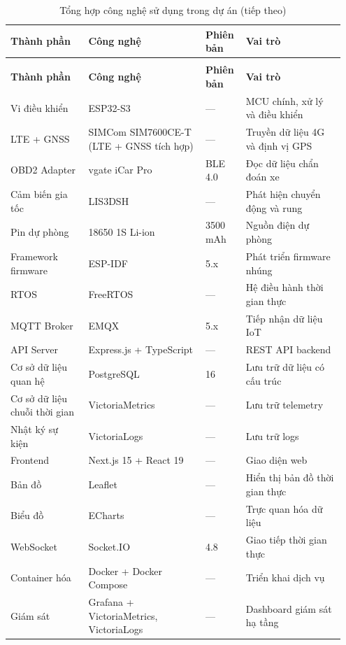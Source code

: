 \documentclass[a4paper]{extarticle}
\newcommand{\thesissettableid}[2]{%
  \renewcommand{\thetable}{#1}%
  \renewcommand{\theHtable}{#2}%
}
\begin{document}
{\thesissettableid{1.3}{tab-ch1-technology-stack-summary}
\def\LTcaptype{table}
\begin{longtable}{|L{0.223\linewidth}|L{0.334\linewidth}|L{0.115\linewidth}|L{0.282\linewidth}|}
\caption{Tổng hợp công nghệ sử dụng trong dự án}\label{tab:ch1-technology-stack-summary}\\
\hline \textbf{Thành phần} & \textbf{Công nghệ} & \textbf{Phiên bản} & \textbf{Vai trò} \\
\hline
\endfirsthead
\caption[]{Tổng hợp công nghệ sử dụng trong dự án (tiếp theo)}\\
\hline \textbf{Thành phần} & \textbf{Công nghệ} & \textbf{Phiên bản} & \textbf{Vai trò} \\
\hline
\endhead
\hline
\endfoot
\endlastfoot
Vi điều khiển & ESP32-S3 & --- & MCU chính, xử lý và điều khiển \\\hline
LTE + GNSS & SIMCom SIM7600CE-T (LTE + GNSS tích hợp) & --- & Truyền dữ
liệu 4G và định vị GPS \\\hline
OBD2 Adapter & vgate iCar Pro & BLE 4.0 & Đọc dữ liệu chẩn đoán xe \\\hline
Cảm biến gia tốc & LIS3DSH & --- & Phát hiện chuyển động và rung \\\hline
Pin dự phòng & 18650 1S Li-ion & 3500 mAh & Nguồn điện dự phòng \\\hline
Framework firmware & ESP-IDF & 5.x & Phát triển firmware nhúng \\\hline
RTOS & FreeRTOS & --- & Hệ điều hành thời gian thực \\\hline
MQTT Broker & EMQX & 5.x & Tiếp nhận dữ liệu IoT \\\hline
API Server & Express.js + TypeScript & --- & REST API backend \\\hline
Cơ sở dữ liệu quan hệ & PostgreSQL & 16 & Lưu trữ dữ liệu có cấu trúc \\\hline
Cơ sở dữ liệu chuỗi thời gian & VictoriaMetrics & --- & Lưu trữ
telemetry \\\hline
Nhật ký sự kiện & VictoriaLogs & --- & Lưu trữ logs \\\hline
Frontend & Next.js 15 + React 19 & --- & Giao diện web \\\hline
Bản đồ & Leaflet & --- & Hiển thị bản đồ thời gian thực \\\hline
Biểu đồ & ECharts & --- & Trực quan hóa dữ liệu \\\hline
WebSocket & Socket.IO & 4.8 & Giao tiếp thời gian thực \\\hline
Container hóa & Docker + Docker Compose & --- & Triển khai dịch vụ \\\hline
Giám sát & Grafana + VictoriaMetrics, VictoriaLogs & --- & Dashboard giám
sát hạ tầng \\\hline
\end{longtable}
}
\end{document}
